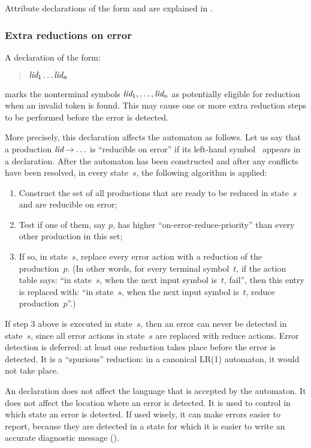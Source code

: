 \documentclass[onecolumn,11pt,nocopyrightspace,preprint]{sigplanconf}
\begin{document}
Attribute declarations
of the form
\dattribute {} 
and
\kw{\%} 
are explained
in .

\subsubsection{Extra reductions on error}
\label{sec:onerrorreduce}

A declaration of the form:
\begin{quote}
\donerrorreduce $\textit{lid}_1 \ldots \textit{lid}_n$
\end{quote}
marks the nonterminal symbols $\textit{lid}_1, \ldots, \textit{lid}_n$ as
potentially eligible for reduction when an invalid token is found.
This may cause one or more extra reduction steps to be performed
before the error is detected.

More precisely, this declaration affects the automaton as follows. Let us say
that a production $\textit{lid} \rightarrow \ldots$ is ``reducible on error'' if
its left-hand symbol~ appears in a \donerrorreduce declaration. After
the automaton has been constructed and after any conflicts have been resolved,
in every state~$s$, the following algorithm is applied:
\begin{enumerate}
\item Construct the set of all productions that are ready to be reduced in
  state~$s$ and are reducible on error;
\item Test if one of them, say $p$, has higher ``on-error-reduce-priority''
  than every other production in this set;
\item If so, in state~$s$, replace every error action with a reduction of the
  production~$p$.
(In other words, for every terminal symbol~$t$, if the action table
says: ``in state~$s$, when the next input symbol is~$t$, fail'', then this
entry is replaced with: ``in state~$s$, when the next input symbol
is~$t$, reduce production~$p$''.)
\end{enumerate}

If step 3 above is executed in state~$s$, then an error can never be detected
in state~$s$, since all error actions in state~$s$ are replaced with reduce
actions. Error detection is deferred: at least one reduction takes place
before the error is detected. It is a ``spurious'' reduction: in a canonical
LR(1) automaton, it would not take place.

An \donerrorreduce declaration does not affect the language that is accepted
by the automaton. It does not affect the location where an error is detected.
It is used to control in which state an error is detected. If used wisely, it
can make errors easier to report, because they are detected in a state for
which it is easier to write an accurate diagnostic message
().
\end{document}
